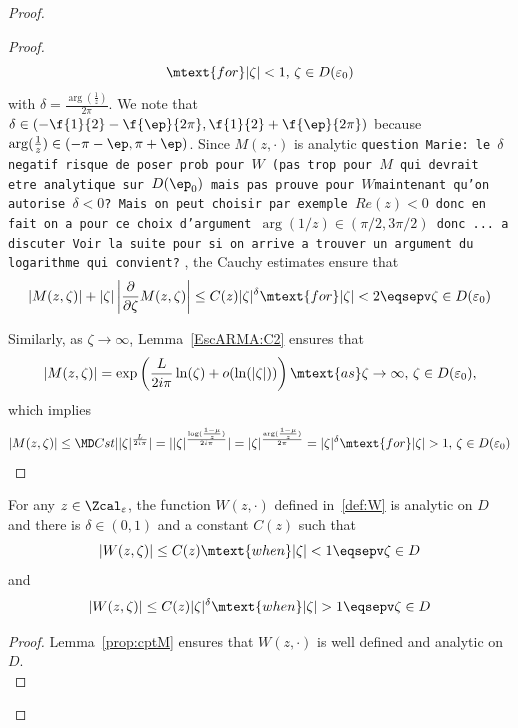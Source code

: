 \begin{proof}
\begin{proof}
$$\mtext{for}  \vert \zeta \vert < 1,\, \zeta \in D(\varepsilon_0)$$ with 
 $\delta = \frac{\arg(\frac{1}{z})}{2\pi}$. We note that {\MD $\delta \in (-\f{1}{2}-\f{\ep}{2\pi},\f{1}{2}+\f{\ep}{2\pi})$ because $\arg(\frac{1}{z}) \in (-\pi-\ep, \pi+\ep)$}.
Since {\MD $M(z, \cdot)$ is analytic {\tt question Marie: le $\delta$ negatif risque de poser prob pour $W$ (pas trop pour $M$ qui devrait etre analytique  sur $D(\ep_0)$ mais pas prouve pour $W$maintenant qu'on autorise $\delta<0$? Mais on peut choisir par exemple $Re(z)<0$ donc en fait on a pour ce choix d'argument $\arg(1/z) \in (\pi/2,3\pi/2)$ donc ... a discuter Voir la suite pour si on arrive a trouver un argument du logarithme qui convient?}} , the Cauchy estimates ensure that 
\begin{equation*}
    |M(z, \zeta)| + |\zeta|\left| \frac{\partial}{\partial \zeta}M(z,\zeta)\right|
    \leq 
    C(z) |\zeta|^\delta \mtext{for} |\zeta| < 2 \eqsepv \zeta \in D(\varepsilon_0)
\end{equation*}

Similarly, as $\zeta \to \infty$, Lemma~\ref{EscARMA:C2} ensures that 
\begin{align*}
    |M(z, \zeta)| 
    = 
    \exp\left(\frac{L}{2i\pi } \ln(\zeta) + o(\ln(|\zeta|)) \right)  \mtext{as} \zeta\to \infty,\, \zeta \in D(\varepsilon_0),
\end{align*}
which implies 
$$ \vert {M(z,\zeta)}{} \vert \leq {\MD Cst }\vert {|\zeta|^{\frac{L}{2i\pi}}}\vert=
\vert |\zeta|^{\frac{\log(\frac{1-\mu}{z})}{2i\pi}}\vert = \vert \zeta \vert^{\frac{\arg (\frac{1-\mu}{z})}{2\pi}}=\vert \zeta \vert^\delta
\mtext{for}  \vert \zeta \vert > 1,\, \zeta \in D(\varepsilon_0)$$
\end{proof}

\begin{lemma}\label{lm:cptW}For any $z \in \Zcal_\varepsilon$, the function $W(z, \cdot)$ defined in~\eqref{def:W} is analytic on $D$ and there is $\delta \in (0,1)$ and a constant $C(z)$ such that
    $$ |W(z, \zeta)| \leq C(z) 
    \mtext{when} |\zeta| < 1 \eqsepv \zeta \in D$$
    and 
    $$ |W(z, \zeta)| \leq C(z)|\zeta|^\delta \mtext{when} |\zeta| > 1 \eqsepv \zeta \in D$$
\end{lemma}
\begin{proof}Lemma~\ref{prop:cptM} ensures that $W(z,\cdot)$ is well defined and analytic on $D$.\\


\end{proof}
\end{proof}
